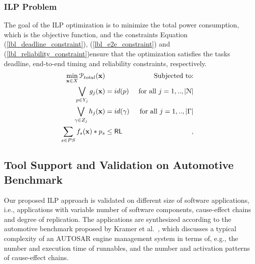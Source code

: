 \subsubsection{ILP Problem}
The goal of the ILP optimization is to minimize the total power consumption, which is the objective function, and the constraints Equation (\ref{lbl_deadline_constraint}), (\ref{lbl_e2e_constraint}) and (\ref{lbl_reliability_constraint})ensure that the optimization satisfies the tasks deadline, end-to-end timing and reliability constraints, respectively.
\begin{align}
\label{eqn_const_func}
\min_{\x\in X} \mathcal{P}_{total}(\x) && \text{ Subjected to:}\\
\label{lbl_deadline_constraint} 
\bigvee\limits_{p\in Y_j} g_j (\x) &= id(p)& \mbox{ for all } j=1,..,|\mathcal{N}|\\ 
\label{lbl_e2e_constraint}
\bigvee\limits_{\gamma\in Z_j} h_j (\x) &= id(\gamma) & \mbox{ for all } j=1,..,|\Gamma|\\ 
\label{lbl_reliability_constraint}
\sum_{s\in PS}f_s(\x)*p_s &\leq \RL&,
\end{align}

\subsection*{Tool Support and Validation on Automotive Benchmark}
Our proposed ILP approach is validated on different size of software applications, i.e., applications with variable number of software components, cause-effect chains and degree of replication. The applications are synthesized according to the automotive benchmark proposed by Kramer et al.~\cite{Kramer2015RealFree}, which discusses a typical complexity of an AUTOSAR engine management system in terms of, e.g., the number and execution time of runnables, and the number and activation patterns of cause-effect chains. 

